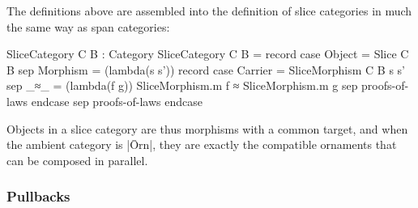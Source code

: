The definitions above are assembled into the definition of slice categories in much the same way as span categories:
\begin{code}
SliceCategory C B : Category
SliceCategory C B = record
    case  Object    = Slice C B
    sep   Morphism  =
            (lambda(s s')) record
              case   Carrier  = SliceMorphism C B s s'
              sep    _≈_      = (lambda(f g)) SliceMorphism.m f ≈ SliceMorphism.m g
              sep    proofs-of-laws endcase
    sep   proofs-of-laws endcase
\end{code}
Objects in a slice category are thus morphisms with a common target, and when the ambient category is |Ōrn|, they are exactly the compatible ornaments that can be composed in parallel.

\subsubsection{Pullbacks}

